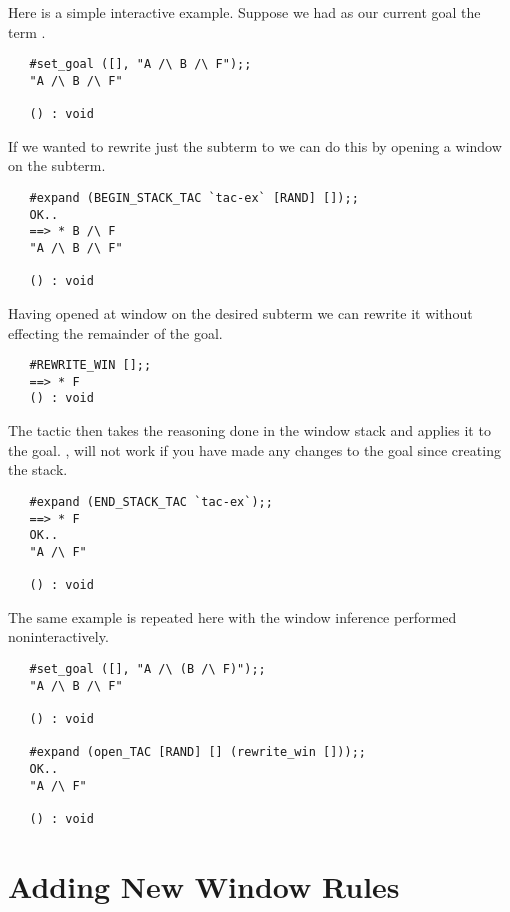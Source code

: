 Here is a simple interactive example.
Suppose we had as our current goal the term .
\setcounter{sessioncount}{1}
\begin{session}\begin{verbatim}
   #set_goal ([], "A /\ B /\ F");;
   "A /\ B /\ F"
   
   () : void
\end{verbatim}\end{session}
If we wanted to rewrite just the subterm  to  we
can do this by opening a window on the subterm.
\begin{session}\begin{verbatim}
   #expand (BEGIN_STACK_TAC `tac-ex` [RAND] []);;
   OK..
   ==> * B /\ F
   "A /\ B /\ F"
   
   () : void
\end{verbatim}\end{session}
Having opened at window on the desired subterm we can rewrite it without
effecting the remainder of the goal.
\begin{session}\begin{verbatim}
   #REWRITE_WIN [];;
   ==> * F
   () : void
\end{verbatim}\end{session}
The  tactic then takes the reasoning done in the 
window stack and applies it to the goal.
, will not work if you have made any changes to the
goal since creating the stack.
\begin{session}\begin{verbatim}
   #expand (END_STACK_TAC `tac-ex`);;
   ==> * F
   OK..
   "A /\ F"
   
   () : void
\end{verbatim}\end{session}
The same example is repeated here with the window inference performed
noninteractively.
\setcounter{sessioncount}{1}
\begin{session}\begin{verbatim}
   #set_goal ([], "A /\ (B /\ F)");;
   "A /\ B /\ F"
   
   () : void
   
   #expand (open_TAC [RAND] [] (rewrite_win []));;
   OK..
   "A /\ F"
   
   () : void
\end{verbatim}\end{session}

\section{Adding New Window Rules}	\label{sec:win}

